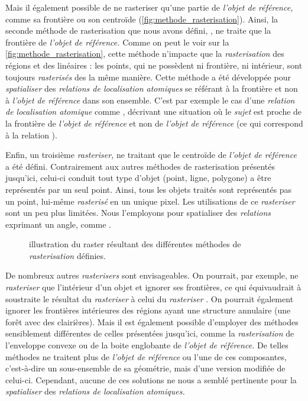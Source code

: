 Mais il également possible de ne rasteriser qu'une partie de
\emph{l'objet de référence,} comme sa frontière ou son centroïde
(\autoref{fig:methode_rasterisation}). Ainsi, la seconde méthode de
rasterisation que nous avons défini, , ne traite que
la frontière de \emph{l'objet de référence.} Comme on peut le voir sur
la \autoref{fig:methode_rasterisation}, cette méthode n'impacte que la
\emph{rasterisation} des régions et des linéaires : les points, qui ne
possèdent ni frontière, ni intérieur, sont toujours \emph{rasterisés}
des la même manière. Cette méthode a été développée pour
\emph{spatialiser} des \emph{relations de localisation atomiques} se
référant à la frontière et non à \emph{l'objet de référence} dans son
ensemble. C'est par exemple le cas d'une \emph{relation de
  localisation atomique} comme ,
décrivant une situation où le \emph{sujet} est proche de la frontière
de \emph{l'objet de référence} et non de \emph{l'objet de référence}
(ce qui correspond à la relation ).

Enfin, un troisième \emph{rasteriser,} ne traitant que le centroïde de
\emph{l'objet de référence} a été défini. Contrairement aux autres
méthodes de rasterisation présentés jusqu'ici, celui-ci conduit tout
type d'objet (\ie point, ligne, polygone) a être représentés par un
seul point. Ainsi, tous les objets traités sont représentés pas un
point, lui-même \emph{rasterisé} en un unique pixel. Les utilisations
de ce \emph{rasteriser} sont un peu plus limitées. Nous l'employons
pour spatialiser des \emph{relations} exprimant un angle, comme
.

\begin{figure}
  \centering
  
  \caption{illustration du raster résultant des différentes méthodes
    de \emph{rasterisation} définies.}
  \label{fig:methode_rasterisation}
\end{figure}

De nombreux autres \emph{rasterisers} sont envisageables. On pourrait,
par exemple, ne \emph{rasteriser} que l'intérieur d'un objet et
ignorer ses frontières, ce qui équivaudrait à soustraite le résultat
du \emph{rasteriser}  à celui du \emph{rasteriser}
. On pourrait également ignorer les frontières
intérieures des régions ayant une structure annulaire (\eg une forêt
avec des clairières). Mais il est également possible d'employer des
méthodes sensiblement différentes de celles présentées jusqu'ici,
comme la \emph{rasterisation} de l'enveloppe convexe ou de la boite
englobante de \emph{l'objet de référence.} De telles méthodes ne
traitent plus de \emph{l'objet de référence} ou l'une de ces
composantes, c'est-à-dire un sous-ensemble de sa géométrie, mais d'une
version modifiée de celui-ci. Cependant, aucune de ces solutions ne
nous a semblé pertinente pour la \emph{spatialiser} des
\emph{relations de localisation atomiques.}


